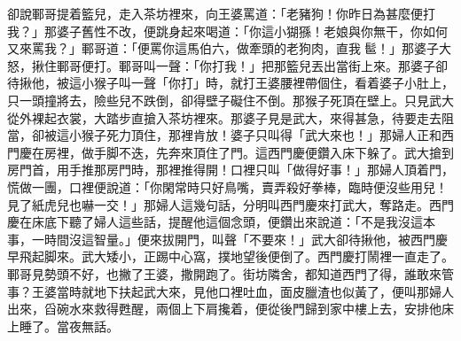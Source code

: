 卻說鄆哥提着籃兒，走入茶坊裡來，向王婆罵道：「老豬狗！你昨日為甚麼便打我？」那婆子舊性不改，便跳身起來喝道：「你這小猢猻！老娘與你無干，你如何又來罵我？」{}鄆哥道：「便罵你這馬伯六，做牽頭的老狗肉，直我𩫻䯲！」那婆子大怒，揪住鄆哥便打。鄆哥叫一聲：「你打我！」把那籃兒丟出當街上來。那婆子卻待揪他，被這小猴子叫一聲「你打」時，就打王婆腰裡帶個住，看着婆子小肚上，只一頭撞將去，{}險些兒不跌倒，卻得壁子礙住不倒。那猴子死頂在壁上。{}只見武大從外裸起衣裳，大踏步直搶入茶坊裡來。那婆子見是武大，來得甚急，待要走去阻當，卻被這小猴子死力頂住，那裡肯放！婆子只叫得「武大來也！」那婦人正和西門慶在房裡，做手脚不迭，先奔來頂住了門。這西門慶便鑽入床下躲了。武大搶到房門首，用手推那房門時，那裡推得開！口裡只叫「做得好事！」那婦人頂着門，慌做一團，{}口裡便說道：「你閑常時只好鳥嘴，賣弄殺好拳棒，臨時便沒些用兒！見了紙虎兒也嚇一交！」那婦人這幾句話，分明叫西門慶來打武大，奪路走。西門慶在床底下聽了婦人這些話，提醒他這個念頭，便鑽出來說道：「不是我沒這本事，一時間沒這智量。」{}便來拔開門，叫聲「不要來！」武大卻待揪他，被西門慶早飛起脚來。武大矮小，正踢中心窩，撲地望後便倒了。西門慶打鬧裡一直走了。鄆哥見勢頭不好，也撇了王婆，撒開跑了。街坊隣舍，都知道西門了得，誰敢來管事？王婆當時就地下扶起武大來，見他口裡吐血，面皮臘渣也似黃了，便叫那婦人出來，舀碗水來救得甦醒，兩個上下肩攙着，便從後門歸到家中樓上去，安排他床上睡了。當夜無話。

